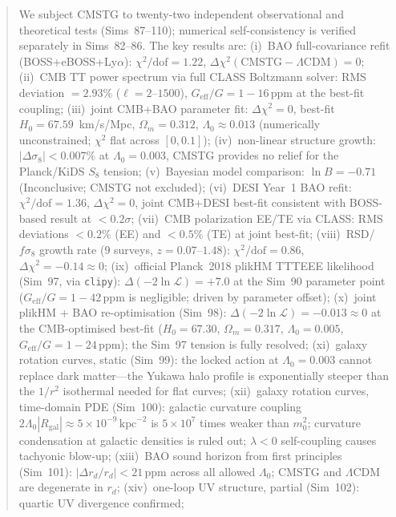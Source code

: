 \documentclass[12pt,a4paper]{article}
\begin{document}
\begin{abstract}
We subject CMSTG to twenty-two independent observational and theoretical tests (Sims~87--110); numerical self-consistency is verified separately in Sims~82--86.
The key results are:
(i)~BAO full-covariance refit (BOSS+eBOSS+Ly$\alpha$):
    $\chi^2/\mathrm{dof}=1.22$, $\Delta\chi^2(\mathrm{CMSTG}-\Lambda\mathrm{CDM})=0$;
(ii)~CMB TT power spectrum via full CLASS Boltzmann solver: RMS deviation $=2.93\%$
    ($\ell=2$--$1500$), $G_{\mathrm{eff}}/G = 1-16\,\mathrm{ppm}$ at the best-fit
    coupling;
(iii)~joint CMB+BAO parameter fit:
    $\Delta\chi^2=0$, best-fit $H_0=67.59$~km/s/Mpc, $\Omega_m=0.312$,
    $\Lambda_0\approx0.013$ (numerically unconstrained; $\chi^2$ flat across $[0,0.1]$);
(iv)~non-linear structure growth: $|\Delta\sigma_8|<0.007\%$ at $\Lambda_0=0.003$,
    CMSTG provides no relief for the Planck/KiDS $S_8$ tension;
(v)~Bayesian model comparison: $\ln B = -0.71$ (Inconclusive; CMSTG not excluded);
(vi)~DESI Year~1 BAO refit: $\chi^2/\mathrm{dof}=1.36$, $\Delta\chi^2=0$,
    joint CMB+DESI best-fit consistent with BOSS-based result at $<0.2\sigma$;
(vii)~CMB polarization EE/TE via CLASS: RMS deviations $<0.2\%$ (EE) and
    $<0.5\%$ (TE) at joint best-fit;
(viii)~RSD/$f\sigma_8$ growth rate (9 surveys, $z=0.07$--$1.48$):
    $\chi^2/\mathrm{dof}=0.86$, $\Delta\chi^2=-0.14\approx0$;
(ix)~official Planck~2018 plikHM TTTEEE likelihood (Sim~97, via \texttt{clipy}):
    $\Delta(-2\ln\mathcal{L})=+7.0$ at the Sim~90 parameter point
    ($G_\mathrm{eff}/G=1-42\,\mathrm{ppm}$ is negligible; driven by parameter offset);
(x)~joint plikHM + BAO re-optimisation (Sim~98): $\Delta(-2\ln\mathcal{L})=-0.013\approx 0$
    at the CMB-optimised best-fit ($H_0=67.30$, $\Omega_m=0.317$, $\Lambda_0=0.005$,
    $G_\mathrm{eff}/G=1-24\,\mathrm{ppm}$); the Sim~97 tension is fully resolved;
(xi)~galaxy rotation curves, static (Sim~99): the locked action at $\Lambda_0=0.003$
    cannot replace dark matter---the Yukawa halo profile is exponentially steeper
    than the $1/r^2$ isothermal needed for flat curves;
(xii)~galaxy rotation curves, time-domain PDE (Sim~100): galactic curvature coupling
    $2\Lambda_0|R_\mathrm{gal}|\approx5\times10^{-9}\,\mathrm{kpc}^{-2}$ is
    $5\times10^7$ times weaker than $m_0^2$; curvature condensation at galactic
    densities is ruled out; $\lambda<0$ self-coupling causes tachyonic blow-up;
(xiii)~BAO sound horizon from first principles (Sim~101): $|\Delta r_d/r_d|<21\,\mathrm{ppm}$
    across all allowed $\Lambda_0$; CMSTG and $\Lambda$CDM are degenerate in $r_d$;
(xiv)~one-loop UV structure, partial (Sim~102): quartic UV divergence confirmed;

\end{abstract}
\end{document}
